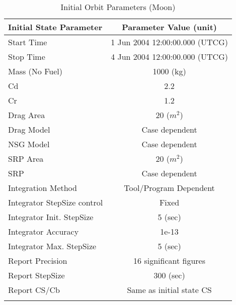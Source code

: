 \begin{table}[htbp!]
\centering \caption{Initial Orbit Parameters (Moon)}
      \begin{tabular}{lc}
      \hline\hline
            Initial State Parameter & Parameter Value (unit)\\
            \hline
            Start Time & 1 Jun 2004 12:00:00.000 (UTCG)\\
            Stop Time & 4 Jun 2004 12:00:00.000 (UTCG)\\
            
            Mass (No Fuel) & 1000 (kg)\\
            Cd & 2.2\\
            Cr & 1.2\\
            Drag Area & 20 ($m^2$)\\
            Drag Model & Case dependent\\
            NSG Model & Case dependent\\
            SRP Area & 20 ($m^2$)\\
            SRP & Case dependent\\
            Integration Method & Tool/Program Dependent\\
            Integrator StepSize control & Fixed\\
            Integrator Init. StepSize & 5 (sec)\\
            Integrator Accuracy & 1e-13\\
            Integrator Max. StepSize & 5 (sec)\\
            Report Precision & 16 significant figures\\
            Report StepSize & 300 (sec)\\
            Report CS/Cb & Same as initial state CS\\
      \hline\hline
      \label{Table: InitStateMoon}
\end{tabular}
\end{table}

